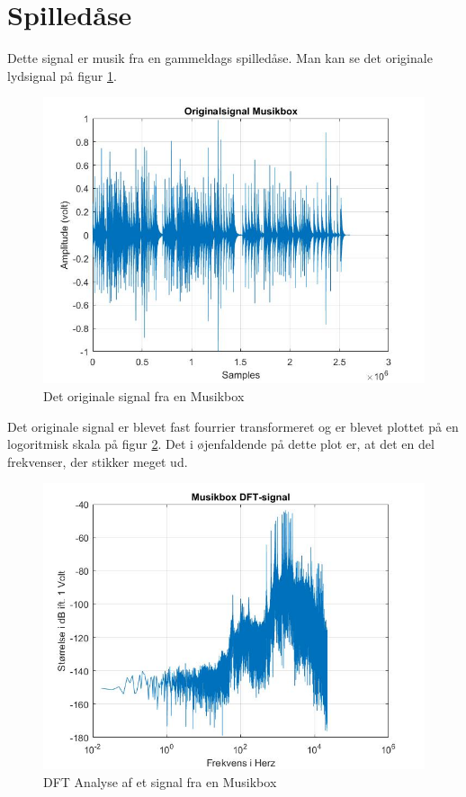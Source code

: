 \section{Spilledåse}
Dette signal er musik fra en gammeldags spilledåse. Man kan se det originale lydsignal på figur \ref{fig:Musikbox original}.
\begin{figure}[H]
	\centering
	\includegraphics[width=140mm]{figures/Musikbox/original.jpg}
	\caption{Det originale signal fra en Musikbox}
	\label{fig:Musikbox original}
\end{figure}

Det originale signal er blevet fast fourrier transformeret og er blevet plottet på en logoritmisk skala på figur \ref{fig:Musikbox DFT}. Det i øjenfaldende på dette plot er, at det en del frekvenser, der stikker meget ud.
\begin{figure}[H]
	\centering
	\includegraphics[width=120mm]{figures/Musikbox/DFT.jpg}
	\caption{DFT Analyse af et signal fra en Musikbox}
	\label{fig:Musikbox DFT}
\end{figure}

